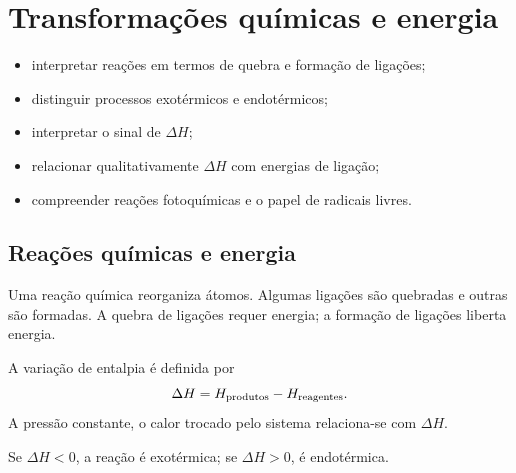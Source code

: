 \documentclass[11pt,a4paper,oneside]{book}
\begin{document}
\chapter{Transformações químicas e energia}

\begin{objetivos}
\begin{itemize}
  \item interpretar reações em termos de quebra e formação de ligações;
  \item distinguir processos exotérmicos e endotérmicos;
  \item interpretar o sinal de $\Delta H$;
  \item relacionar qualitativamente $\Delta H$ com energias de ligação;
  \item compreender reações fotoquímicas e o papel de radicais livres.
\end{itemize}
\end{objetivos}

\section{Reações químicas e energia}
Uma reação química reorganiza átomos. Algumas ligações são quebradas e outras são formadas. A quebra de ligações requer energia; a formação de ligações liberta energia.

A variação de entalpia é definida por
\[
\Delta H=H_{\rm produtos}-H_{\rm reagentes}.
\]
A pressão constante, o calor trocado pelo sistema relaciona-se com $\Delta H$.

\begin{center}
\end{center}

Se $\Delta H<0$, a reação é exotérmica; se $\Delta H>0$, é endotérmica.
\end{document}
